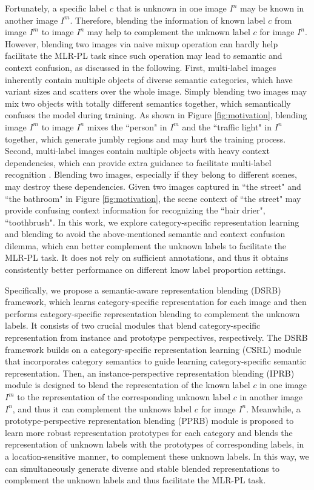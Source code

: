 \documentclass[lettersize,journal]{IEEEtran}
\begin{document}
Fortunately, a specific label $c$ that is unknown in one image $I^n$ may be known in another image $I^m$. Therefore, blending the information of known label $c$ from image $I^m$ to image $I^n$ may help to complement the unknown label $c$ for image $I^n$. However, blending two images via naive mixup operation \cite{Zhang2017Mixup} can hardly help facilitate the MLR-PL task since such operation may lead to semantic and context confusion, as discussed in the following. First, multi-label images inherently contain multiple objects of diverse semantic categories, which have variant sizes and scatters over the whole image. Simply blending two images may mix two objects with totally different semantics together, which semantically confuses the model during training. As shown in Figure \ref{fig:motivation}, blending image $I^m$ to image $I^n$ mixes the ``person" in $I^m$ and the ``traffic light" in $I^n$ together, which generate jumbly regions and may hurt the training process. Second, multi-label images contain multiple objects with heavy context dependencies, which can provide extra guidance to facilitate multi-label recognition \cite{Chen2019SSGRL,Chen2022KGGR}. Blending two images, especially if they belong to different scenes, may destroy these dependencies. Given two images captured in ``the street" and ``the bathroom" in Figure \ref{fig:motivation}, the scene context of ``the street" may provide confusing context information for recognizing the ``hair drier", ``toothbrush". In this work, we explore category-specific representation learning and blending to avoid the above-mentioned semantic and context confusion dilemma, which can better complement the unknown labels to facilitate the MLR-PL task. It does not rely on sufficient annotations, and thus it obtains consistently better performance on different know label proportion settings.

Specifically, we propose a semantic-aware representation blending (DSRB) framework, which learns category-specific representation for each image and then performs category-specific representation blending to complement the unknown labels. It consists of two crucial modules that blend category-specific representation from instance and prototype perspectives, respectively. The DSRB framework builds on a category-specific representation learning (CSRL) module that incorporates category semantics to guide learning category-specific semantic representation. Then, an instance-perspective representation blending (IPRB) module is designed to blend the representation of the known label $c$ in one image $I^m$ to the representation of the corresponding unknown label $c$ in another image $I^n$, and thus it can complement the unknows label $c$ for image $I^n$. Meanwhile, a prototype-perspective representation blending (PPRB) module is proposed to learn more robust representation prototypes for each category and blends the representation of unknown labels with the prototypes of corresponding labels, in a location-sensitive manner, to complement these unknown labels. In this way, we can simultaneously generate diverse and stable blended representations to complement the unknown labels and thus facilitate the MLR-PL task.
\end{document}
